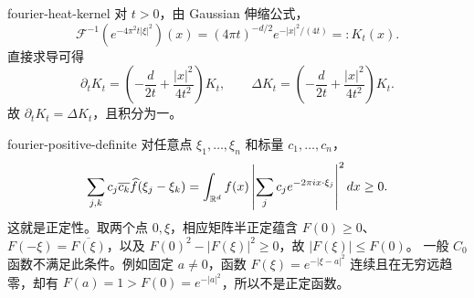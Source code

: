 \begin{solution}{fourier-heat-kernel}
对 \(t>0\)，由 Gaussian 伸缩公式，
\[
 \mathcal F^{-1}\!\left(e^{-4\pi^2t|\xi|^2}\right)(x)
 =(4\pi t)^{-d/2}e^{-|x|^2/(4t)}=:K_t(x).
\]
直接求导可得
\[
 \partial_tK_t=\left(-\frac d{2t}+\frac{|x|^2}{4t^2}\right)K_t,
 \qquad
 \Delta K_t=\left(-\frac d{2t}+\frac{|x|^2}{4t^2}\right)K_t.
\]
故 \(\partial_tK_t=\Delta K_t\)，且积分为一。
\end{solution}

\begin{solution}{fourier-positive-definite}
对任意点 \(\xi_1,\ldots,\xi_n\) 和标量 \(c_1,\ldots,c_n\)，
\[
 \sum_{j,k}c_j\overline{c_k}\widehat f(\xi_j-\xi_k)
 =\int_{\mathbb{R}^d}f(x)
 \left|\sum_jc_je^{-2\pi ix\cdot\xi_j}\right|^2dx\ge0.
\]
这就是正定性。取两个点 \(0,\xi\)，相应矩阵半正定蕴含
\(F(0)\ge0\)、\(F(-\xi)=\overline{F(\xi)}\)，以及
\(F(0)^2-|F(\xi)|^2\ge0\)，故 \(|F(\xi)|\le F(0)\)。
一般 \(C_0\) 函数不满足此条件。例如固定 \(a\ne0\)，函数
\(F(\xi)=e^{-|\xi-a|^2}\) 连续且在无穷远趋零，却有
\(F(a)=1>F(0)=e^{-|a|^2}\)，所以不是正定函数。
\end{solution}
